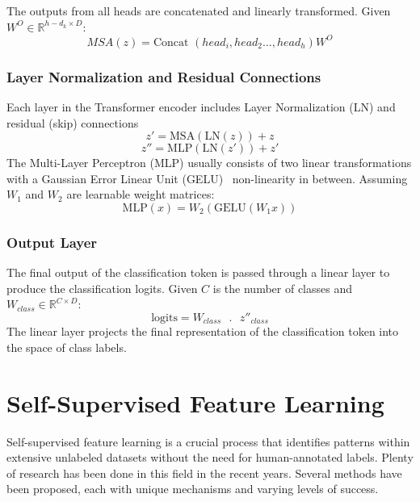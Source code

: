 The outputs from all heads are concatenated and linearly transformed. Given \(W^O \in \mathbb{R}^{h-d_k \times D } \):
\begin{equation}
	MSA(z) = \text{Concat  }(head_i, head_2..., head_h)W^O
\end{equation}

\subsubsection{Layer Normalization and Residual Connections}
Each layer in the Transformer encoder includes Layer Normalization (LN) and residual (skip) connections
\begin{equation}
	z' = \text{MSA}(\text{LN}(z)) + z
\end{equation}
\begin{equation}
	z'' = \text{MLP}(\text{LN}(z')) + z'
\end{equation}
The Multi-Layer Perceptron (MLP) usually consists of two linear transformations with a Gaussian Error Linear Unit (GELU)~\cite{hendrycks2023gaussianerrorlinearunits} non-linearity in between. Assuming \(W_1\) and \(W_2\) are learnable weight matrices:
\begin{equation}
	\text{MLP}(x) = W_2(\text{GELU}(W_1x))
\end{equation}

\subsubsection{Output Layer}
The final output of the classification token is passed through a linear layer to produce the classification logits. Given \(C\) is the number of classes and \(W_{class} \in \mathbb{R}^{C \times D }\):
\begin{equation}
	\text{logits} = W_{class} \text{ }.\text{ } z''_{class}
\end{equation}
The linear layer projects the final representation of the classification token into the space of class labels.

\section{Self-Supervised Feature Learning}
Self-supervised feature learning is a crucial process that identifies patterns within extensive unlabeled datasets without the need for human-annotated labels. Plenty of research has been done in this field in the recent years. Several methods have been proposed, each with unique mechanisms and varying levels of success.

